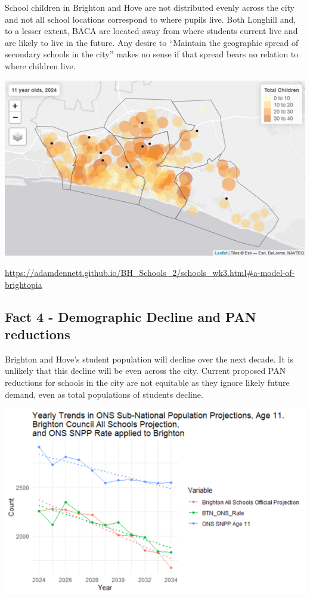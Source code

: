 \documentclass[
  letterpaper,
  DIV=11,
  numbers=noendperiod]{scrartcl}
\begin{document}
School children in Brighton and Hove are not distributed evenly across
the city and not all school locations correspond to where pupils live.
Both Longhill and, to a lesser extent, BACA are located away from where
students current live and are likely to live in the future. Any desire
to ``Maintain the geographic spread of secondary schools in the city''
makes no sense if that spread bears no relation to where children live.

\includegraphics{images/map_11_year_olds_2024.png}

\url{https://adamdennett.github.io/BH_Schools_2/schools_wk3.html\#a-model-of-brightopia}

\hypertarget{fact-4---demographic-decline-and-pan-reductions}{%
\subsection{Fact 4 - Demographic Decline and PAN
reductions}\label{fact-4---demographic-decline-and-pan-reductions}}

Brighton and Hove's student population will decline over the next
decade. It is unlikely that this decline will be even across the city.
Current proposed PAN reductions for schools in the city are not
equitable as they ignore likely future demand, even as total populations
of students decline.

\includegraphics{images/pop_proj.png}
\end{document}
